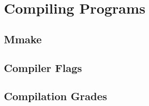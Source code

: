 
\chapter{Compiling Programs}
\section{Mmake}
\section{Compiler Flags}
\section{Compilation Grades}



